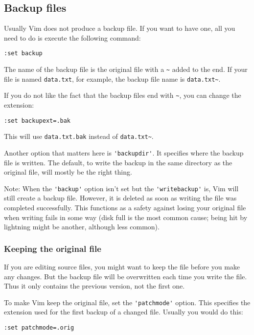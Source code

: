 \subsection{Backup files}
\label{Backup files}
Usually Vim does not produce a backup file.
If you want to have one, all you need to do is execute the following command:

 \begin{Verbatim}[samepage=true]
 :set backup
 \end{Verbatim}

The name of the backup file is the original file with a  \verb!~!  added to the end.
If your file is named \verb!data.txt!, for example, the backup file name is \verb!data.txt~!.

If you do not like the fact that the backup files end with \verb!~!, you can change the extension:

 \begin{Verbatim}[samepage=true]
 :set backupext=.bak
 \end{Verbatim}

This will use \verb!data.txt.bak! instead of \verb!data.txt~!.

Another option that matters here is \verb!'backupdir'!.
It specifies where the backup file is written.
The default, to write the backup in the same directory as the original file, will mostly be the right thing.

Note: When the \verb!'backup'! option isn't set but the \verb!'writebackup'! is, Vim will still create a backup file.
However, it is deleted as soon as writing the file was completed successfully.
This functions as a safety against losing your original file when writing fails in some way (disk full is the most common cause; being hit by lightning might be another, although less common).

\subsubsection{Keeping the original file}
If you are editing source files, you might want to keep the file before you make any changes.
But the backup file will be overwritten each time you write the file.
Thus it only contains the previous version, not the first one.

To make Vim keep the original file, set the \verb!'patchmode'! option.
This specifies the extension used for the first backup of a changed file.
Usually you would do this:

 \begin{Verbatim}[samepage=true]
 :set patchmode=.orig
 \end{Verbatim}

